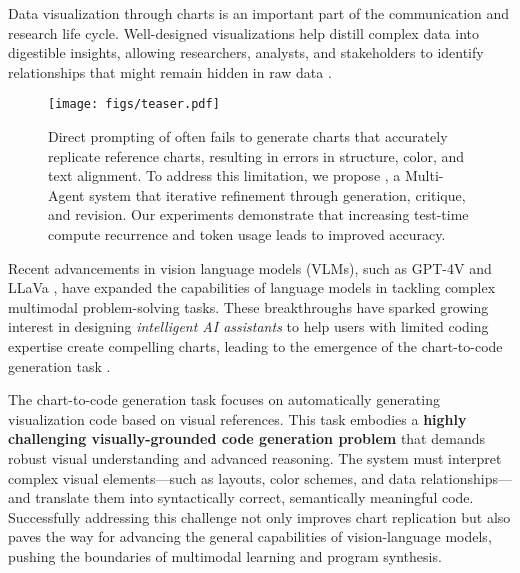 Data visualization through charts is an important part of the communication and research life cycle. Well-designed visualizations help distill complex data into digestible insights, allowing researchers, analysts, and stakeholders to identify relationships that might remain hidden in raw data \citep{qin2020making, xu2023chartbench, yang2024matplotagent}.

\begin{figure}[ht]
    \centering
    \texttt{[image: figs/teaser.pdf]}
    \caption{Direct prompting of \gpt often fails to generate charts that accurately replicate reference charts, resulting in errors in structure, color, and text alignment. To address this limitation, we propose \model{}, a Multi-Agent system that iterative refinement through generation, critique, and revision. Our experiments demonstrate that increasing test-time compute recurrence and token usage leads to improved accuracy.}
    \label{fig:teaser}
    \vspace{-0.1in}
\end{figure}


Recent advancements in vision language models (VLMs), such as GPT-4V \cite{GPT4V} and LLaVa \cite{li2024llavanext-strong}, have expanded the capabilities of language models in tackling complex multimodal problem-solving tasks. These breakthroughs have sparked growing interest in designing \textit{intelligent AI assistants} to help users with limited coding expertise create compelling charts, leading to the emergence of the chart-to-code generation task \citep {wu2024plot2code, han2023chartllama,  shi2024chartmimic}. 

The chart-to-code generation task focuses on automatically generating visualization code based on visual references. 
This task embodies a \textbf{highly challenging visually-grounded code generation problem} that demands robust visual understanding and advanced reasoning. The system must interpret complex visual elements—such as layouts, color schemes, and data relationships—and translate them into syntactically correct, semantically meaningful code. Successfully addressing this challenge not only improves chart replication but also paves the way for advancing the general capabilities of vision-language models, pushing the boundaries of multimodal learning and program synthesis.

